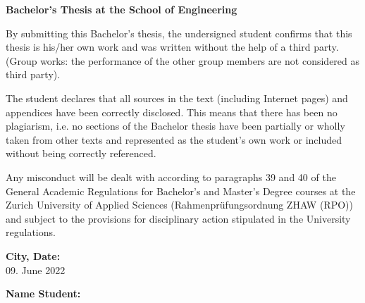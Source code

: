 \documentclass[
11pt, %
english, %
singlespacing, %
headsepline, %
]{MastersDoctoralThesis} %
\author{Ricardo Daniel \textsc{Monteiro Simões}\\  Patrick \textsc{Huber}}
\begin{document}
\frontmatter %

\pagestyle{plain} %





\clearpage



\begin{declaration}
\addchaptertocentry{\authorshipname} %
\textbf{Bachelor's Thesis at the School of Engineering}

By submitting this Bachelor’s thesis, the undersigned student confirms that this thesis is his/her own work and was written without the help of a third party. (Group works: the performance of the other group members are not considered as third party).

The student declares that all sources in the text (including Internet pages) and appendices have been correctly disclosed. This means that there has been no plagiarism, i.e. no sections of the Bachelor thesis have been partially or wholly taken from other texts and represented as the student’s own work or included without being correctly referenced.

Any misconduct will be dealt with according to paragraphs 39 and 40 of the General Academic Regulations for Bachelor’s and Master’s Degree courses at the Zurich University of Applied Sciences (Rahmenprüfungsordnung ZHAW (RPO)) and subject to the provisions for disciplinary action stipulated in the University regulations.

\vspace{3.5cm}

\begin{minipage}[t]{0.4\textwidth}
\begin{flushleft} \large
\textbf{City, Date:}\\
09. June 2022
\end{flushleft}
\end{minipage}
\begin{minipage}[t]{0.5\textwidth}
\begin{flushright} \large
\textbf{Name Student:} \\
\authorname
\end{flushright}
\end{minipage}\\[3cm]


\end{declaration}
\end{document}
